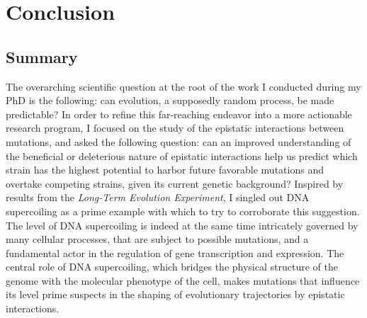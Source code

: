 \chapter{Conclusion}
\label{chap:conclusion}

\section{Summary}

The overarching scientific question at the root of the work I conducted during my PhD is the following: can evolution, a supposedly random process, be made predictable?
In order to refine this far-reaching endeavor into a more actionable research program, I focused on the study of the epistatic interactions between mutations, and asked the following question: can an improved understanding of the beneficial or deleterious nature of epistatic interactions help us predict which strain has the highest potential to harbor future favorable mutations and overtake competing strains, given its current genetic background?
Inspired by results from the \emph{Long-Term Evolution Experiment}, I singled out DNA supercoiling as a prime example with which to try to corroborate this suggestion.
The level of DNA supercoiling is indeed at the same time intricately governed by many cellular processes, that are subject to possible mutations, and a fundamental actor in the regulation of gene transcription and expression.
The central role of DNA supercoiling, which bridges the physical structure of the genome with the molecular phenotype of the cell, makes mutations that influence its level prime suspects in the shaping of evolutionary trajectories by epistatic interactions.

